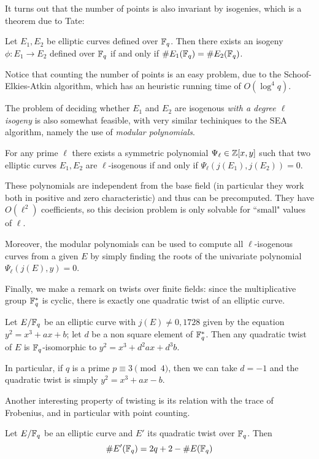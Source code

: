 It turns out that the number of points is also invariant by isogenies, which is a theorem due to Tate:
\begin{theorem}
    Let $E_1,E_2$ be elliptic curves defined over $\mathbb{F}_q$. Then there exists an isogeny $\phi: E_1\to E_2$ defined over $\mathbb{F}_q$ if and only if $\# E_1(\mathbb{F}_q)=\# E_2(\mathbb{F}_q)$.
\end{theorem}

Notice that counting the number of points is an easy problem, due to the Schoof-Elkies-Atkin algorithm, which has an heuristic running time of $O(\log^4 q)$.

The problem of deciding whether $E_1$ and $E_2$ are isogenous \emph{with a degree $\ell$ isogeny} is also somewhat feasible, with very similar techiniques to the SEA algorithm, namely the use of \emph{modular polynomials}.

\begin{theorem}
    For any prime $\ell$ there exists a symmetric polynomial $\Psi_\ell\in\mathbb{Z}[x,y]$ such that two elliptic curves $E_1,E_2$ are $\ell$-isogenous if and only if $\Psi_\ell(j(E_1),j(E_2))=0$.
\end{theorem}

These polynomials are independent from the base field (in particular they work both in positive and zero characteristic) and thus can be precomputed. They have $O(\ell^2)$ coefficients, so this decision problem is only solvable for ``small" values of $\ell$.

Moreover, the modular polynomials can be used to compute all $\ell$-isogenous curves from a given $E$ by simply finding the roots of the univariate polynomial $\Psi_\ell(j(E),y)=0$.

Finally, we make a remark on twists over finite fields: since the multiplicative group $\mathbb{F}_q^\ast$ is cyclic, there is exactly one quadratic twist of an elliptic curve.
\begin{proposition}
    Let $E/\mathbb{F}_q$ be an elliptic curve with $j(E)\neq0,1728$ given by the equation $y^2=x^3+ax+b$; let $d$ be a non square element of $\mathbb{F}_q^\ast$. Then any quadratic twist of $E$ is $\mathbb{F}_q$-isomorphic to $y^2=x^3+d^2ax+d^3b$.
\end{proposition}
In particular, if $q$ is a prime $p\equiv3\pmod4$, then we can take $d=-1$ and the quadratic twist is simply $y^2=x^3+ax-b$.

Another interesting property of twisting is its relation with the trace of Frobenius, and in particular with point counting.
\begin{proposition}
    Let $E/\mathbb{F}_q$ be an elliptic curve and $E'$ its quadratic twist over $\mathbb{F}_q$. Then $$\# E'(\mathbb{F}_q) = 2q+2 - \# E(\mathbb{F}_q)$$
\end{proposition}


